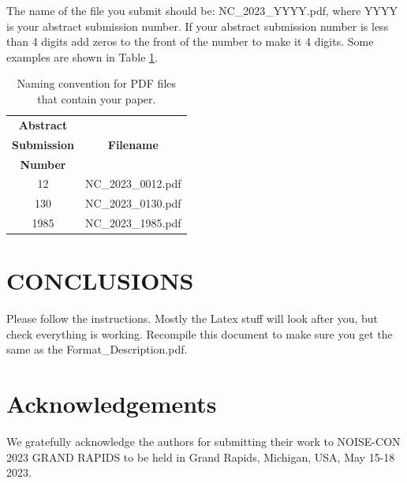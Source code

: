 \documentclass[letterpaper,12pt]{article}
\begin{document}
The name of the file you submit should be: NC\_2023\_YYYY.pdf, where YYYY is your abstract submission number. If your abstract submission number is less than 4 digits add zeros to the front of the number to make it 4 digits.  Some examples are shown in Table \ref{Tab:2}.
\begin{table}[h!]

\caption{Naming convention for PDF files that contain your paper.}
\label{Tab:2}

\begin{center}
\begin{tabular}{c c} 
 \hline
{\textbf{Abstract }} & \\
{\textbf{Submission}} & { \textbf{Filename}}\\
{\textbf{Number}} &\\
 \hline
 12 & NC\_2023\_0012.pdf  \\ 
 \hline
 130 & NC\_2023\_0130.pdf   \\
 \hline
 1985 & NC\_2023\_1985.pdf  \\ [1ex] 
 \hline
\end{tabular}
\end{center}
\end{table}

\section{CONCLUSIONS}

\noindent
Please follow the instructions.  Mostly the Latex stuff will look after you, but check everything is working. Recompile this document to make sure you get the same as the Format\_Description.pdf. 

\section*{Acknowledgements}
\noindent
We gratefully acknowledge the authors for submitting their work to NOISE-CON 2023 GRAND RAPIDS to be held in Grand Rapids, Michigan, USA, May 15-18 2023.


 
\end{document}
